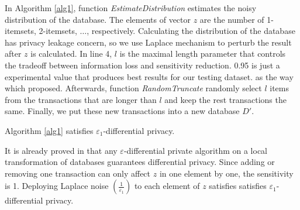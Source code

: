 \documentclass[conference]{IEEEtran}
\begin{document}
In Algorithm \ref{alg1}, function {\it{EstimateDistribution}} estimates the noisy distribution of the database.
The elements of vector $z$ are the number of 1-itemsets, 2-itemsets, $\ldots$, respectively.
Calculating the distribution of the database has privacy leakage concern, so we use Laplace mechanism to perturb the result after $z$ is calculated.
In line 4, $l$ is the maximal length parameter that controls the tradeoff between information loss and sensitivity reduction.
0.95 is just a experimental value that produces best results for our testing dataset.
as the way which \cite{b6} proposed.
Afterwards, function {\it{RandomTruncate}} randomly select $l$ items from the transactions that are longer than $l$ and keep the rest transactions the same.
Finally, we put these new transactions into a new database $D'$.
\begin{theorem}
Algorithm \ref{alg1} satisfies $\varepsilon_1$-differential privacy.
\label{th1}
\end{theorem}
\begin{IEEEproof}
It is already proved in \cite{b6} that any $\varepsilon$-differential private algorithm on a local transformation of databases guarantees differential privacy.
Since adding or removing one transaction can only affect $z$ in one element by one, the sensitivity is 1.
Deploying Laplace noise $(\frac{1}{\varepsilon_1})$ to each element of $z$ satisfies satisfies $\varepsilon_1$-differential privacy.
\end{IEEEproof}
\end{document}
